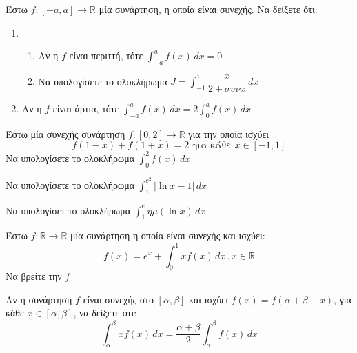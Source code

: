 \documentclass{presentation}
\begin{document}
\begin{askisi}
  Έστω $f:[-a,a]\to\mathbb{R}$ μία συνάρτηση, η οποία είναι συνεχής. Να δείξετε ότι:
  \begin{enumerate}
    \item
          \begin{enumerate}
            \item<1-> Αν η $f$ είναι περιττή, τότε $\int_{-a}^{a} f(x) \,dx=0$
            \item<2-> Να υπολογίσετε το ολοκλήρωμα $J=\int_{-1}^{1} \dfrac{x}{2+συνx} \,dx$
          \end{enumerate}
    \item<3-> Αν η $f$ είναι άρτια, τότε $\int_{-a}^{a} f(x) \,dx=2\int_{0}^{a} f(x) \,dx$
  \end{enumerate}

\end{askisi}

\begin{askisi}
  Έστω μία συνεχής συνάρτηση $f:[0,2]\to\mathbb{R}$ για την οποία ισχύει
  $$f(1-x)+f(1+x)=2\text{ για κάθε }x\in [-1,1]$$
  Να υπολογίσετε το ολοκλήρωμα $\int_{0}^{2} f(x) \,dx$

\end{askisi}

\begin{askisi}
  Να υπολογίσετε το ολοκλήρωμα $\int_{1}^{e^2} |\ln x-1| \,dx$

\end{askisi}

\begin{askisi}
  Να υπολογίσετ το ολοκλήρωμα $\int_{1}^{e} ημ(\ln x) \,dx$

\end{askisi}

\begin{askisi}
  Έστω $f:\mathbb{R}\to\mathbb{R}$ μία συνάρτηση η οποία είναι συνεχής και ισχύει:
  $$f(x)=e^x+\int_{0}^{1} xf(x) \,dx\, , x\in\mathbb{R}$$
  Να βρείτε την $f$

\end{askisi}

\begin{askisi}
  Αν η συνάρτηση $f$ είναι συνεχής στο $[α,β]$ και ισχύει $f(x)=f(α+β-x)$, για κάθε $x\in [α,β]$, να δείξετε ότι:
  $$\int_{α}^{β} xf(x) \,dx=\dfrac{α+β}{2}\int_{α}^{β} f(x) \,dx$$

\end{askisi}
\end{document}
